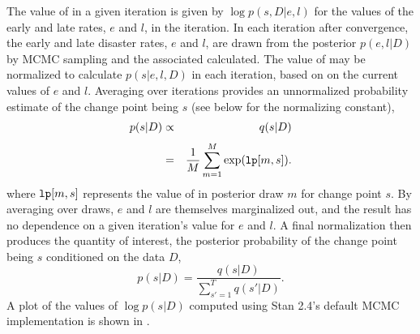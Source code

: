 The value of  in a given iteration is given by $\log
p(s,D|e,l)$ for the values of the early and late rates, $e$ and $l$,
in the iteration.  In each iteration after convergence, the early and
late disaster rates, $e$ and $l$, are drawn from the posterior
$p(e,l|D)$ by MCMC sampling and the associated  calculated.
The value of  may be normalized to calculate $p(s|e,l,D)$ in
each iteration, based on on the current values of $e$ and $l$.
Averaging over iterations provides an unnormalized probability
estimate of the change point being $s$ (see below for the normalizing
constant),
%
\begin{eqnarray*}
p(s | D)
& \propto &
q(s | D)
\\[3pt]
& = & 
\frac{1}{M} \sum_{m=1}^{M} \exp(\code{lp}[m,s]).
\end{eqnarray*}
%
where $\mbox{\code{lp}}[m,s]$ represents the value of  in
posterior draw $m$ for change point $s$.  By averaging over draws,
$e$ and $l$ are themselves marginalized out, and the result has no
dependence on a given iteration's value for $e$ and $l$.  A final
normalization then produces the quantity of interest, the posterior
probability of the change point being $s$ conditioned on the data $D$,
%
\[
p(s | D)
=
\frac{q(s|D)}{\sum_{s'=1}^T q(s' | D)}.
\]
%
A plot of the values of $\log p(s|D)$ computed using Stan 2.4's
default MCMC implementation is shown in
.
%
